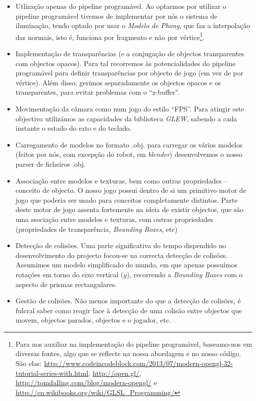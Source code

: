 \documentclass[11pt,a4paper]{article}
\begin{document}
\begin{itemize}
  \item Utlização apenas do pipeline programável. Ao optarmos por utilizar o pipeline programável tivemos de implementar por nós o sistema de iluminação, tendo optado por usar o \emph{Modelo de Phong}, que faz a interpolação das normais, isto é, funciona por fragmento e não por vértice\footnote{Para nos auxiliar na implementação do pipeline programável, baseamo-nos em diversas fontes, algo que se reflecte na nossa abordagem e no nosso código. São elas: \url{http://www.codeincodeblock.com/2013/07/modern-opengl-32-tutorial-series-with.html}, \url{http://open.gl/}, \url{http://tomdalling.com/blog/modern-opengl/} e \url{http://en.wikibooks.org/wiki/GLSL_Programming/}}.
  \item Implementação de transparências (e a conjugação de objectos transparentes com objectos opacos). Para tal recorremos às potencialidades do pipeline programável para definir transparências por objecto de jogo (em vez de por vértice). Além disso, gerimos separadamente os objectos opacos e os transparentes, para evitar problemas com o ``z-buffer''.
  \item Movimentação da câmara como num jogo do estilo ``FPS''. Para atingir este objectivo utilizámos as capacidades da biblioteca \emph{GLEW}, sabendo a cada instante o estado do rato e do teclado.
  \item Carregamento de modelos no formato .obj. para carregar os vários modelos (feitos por nós, com excepção do robot, em \emph{blender}) desenvolvemos o nosso parser de ficheiros .obj.
  \item Associação entre modelos e texturas, bem como outras propriedades -- conceito de objecto. O nosso jogo possui dentro de si um primitivo motor de jogo que poderia ser usado para conceitos completamente distintos. Parte deste motor de jogo assenta fortemente na ideia de existir objectos, que são uma ssociação entre modelos e texturas, com outras propriedades (propriedades de transparência, \emph{Bounding Boxes}, etc)
  \item Detecção de colisões. Uma parte significativa do tempo dispendido no desenvolvimento do projecto focou-se na correcta detecção de colisões. Assumimos um modelo simplificado do mundo, em que apenas possuímos rotações em torno do eixo vertical ($y$), recorrendo a \emph{Bounding Boxes} com o aspecto de prismas rectangulares.
  \item Gestão de colisões. Não menos importante do que a detecção de colisões, é fulcral saber como reagir face à detecção de uma colisão entre objectos que movem, objectos parados, objectos e o jogador, etc.

\end{itemize}
\end{document}
